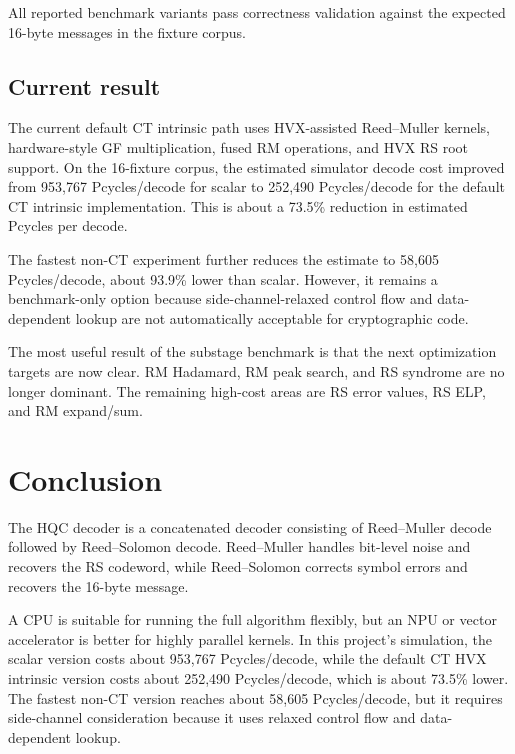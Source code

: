 \documentclass[12pt,a4paper]{article}
\begin{document}
All reported benchmark variants pass correctness validation against the expected 16-byte messages in the fixture corpus.

\subsection{Current result}

The current default CT intrinsic path uses HVX-assisted Reed--Muller kernels, hardware-style GF multiplication, fused RM operations, and HVX RS root support. On the 16-fixture corpus, the estimated simulator decode cost improved from 953,767 Pcycles/decode for scalar to 252,490 Pcycles/decode for the default CT intrinsic implementation. This is about a 73.5\% reduction in estimated Pcycles per decode.

The fastest non-CT experiment further reduces the estimate to 58,605 Pcycles/decode, about 93.9\% lower than scalar. However, it remains a benchmark-only option because side-channel-relaxed control flow and data-dependent lookup are not automatically acceptable for cryptographic code.

The most useful result of the substage benchmark is that the next optimization targets are now clear. RM Hadamard, RM peak search, and RS syndrome are no longer dominant. The remaining high-cost areas are RS error values, RS ELP, and RM expand/sum.

\section{Conclusion}

The HQC decoder is a concatenated decoder consisting of Reed--Muller decode followed by Reed--Solomon decode. Reed--Muller handles bit-level noise and recovers the RS codeword, while Reed--Solomon corrects symbol errors and recovers the 16-byte message.

A CPU is suitable for running the full algorithm flexibly, but an NPU or vector accelerator is better for highly parallel kernels. In this project's simulation, the scalar version costs about 953,767 Pcycles/decode, while the default CT HVX intrinsic version costs about 252,490 Pcycles/decode, which is about 73.5\% lower. The fastest non-CT version reaches about 58,605 Pcycles/decode, but it requires side-channel consideration because it uses relaxed control flow and data-dependent lookup.
\end{document}
